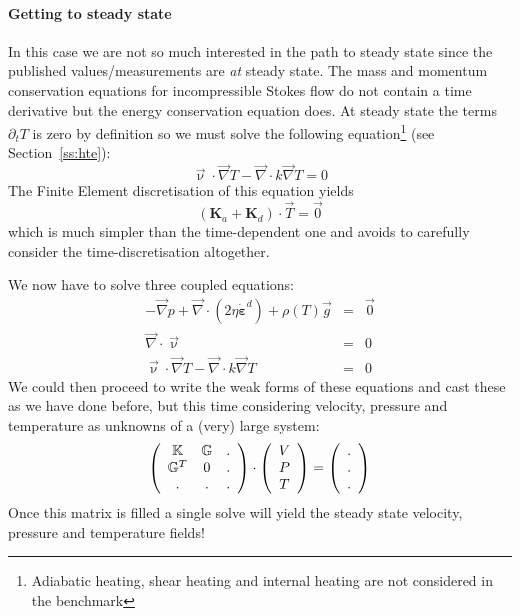 \paragraph{Getting to steady state}  
In this case we are not so much interested in the path to steady state since 
the published values/measurements are {\it at} steady state.
The mass and momentum conservation equations for incompressible Stokes flow do not 
contain a time derivative but the energy conservation equation does. 
At steady state the terms $\partial_t T$ is zero by definition so we must solve
the following equation\footnote{Adiabatic heating, shear heating and internal heating are not considered
in the benchmark} (see Section~\ref{ss:hte}):
\begin{equation}
\vec{\upnu}\cdot\vec\nabla T - {\vec \nabla} \cdot k {\vec \nabla} T = 0
\end{equation}
The Finite Element discretisation of this equation yields 
\[
({\bm K}_a + {\bm K}_d) \cdot \vec{T} = \vec{0}
\]
which is much simpler than the time-dependent one and avoids to carefully consider the 
time-discretisation altogether. 

We now have to solve three coupled equations:
\begin{eqnarray}
-{\vec \nabla}p + {\vec \nabla}\cdot (2 \eta \dot{\bm \varepsilon}^d ) + \rho(T) {\vec g} &=& \vec{0} \\
{\vec \nabla}\cdot{\vec \upnu} &=& 0 \\ 
\vec{\upnu}\cdot\vec\nabla T - {\vec \nabla} \cdot k {\vec \nabla} T &=& 0 
\end{eqnarray}
We could then proceed to write the weak forms of these equations and cast these as we have done before, 
but this time considering velocity, pressure and temperature as unknowns of a (very) large system:
\[
\left(
\begin{array}{ccc}
{\mathbb{K}} & {\mathbb{G}} & . \\
{\mathbb{G}}^T & 0 & . \\
. & . & . 
\end{array}
\right)
\cdot
\left(
\begin{array}{c}
V \\ P \\ T 
\end{array}
\right)
=
\left(
\begin{array}{c}
. \\ . \\ .
\end{array}
\right)
\]
Once this matrix is filled a single solve will yield the steady state velocity, pressure and 
temperature fields! 


